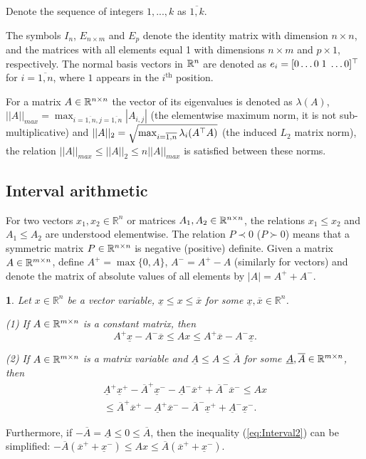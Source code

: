 \documentclass[letterpaper, 10 pt, conference]{ieeeconf}
\theoremstyle{plain}
\newtheorem{lem}{\protect\lemmaname}
\theoremstyle{definition}
\theoremstyle{plain}
\theoremstyle{plain}
\theoremstyle{remark}
\providecommand{\lemmaname}{Lemma}
\begin{document}
Denote the sequence of integers $1,...,k$ as $\overline{1,k}$. 

The symbols $I_{n}$, $E_{n\times m}$ and $E_{p}$ denote the identity matrix with dimension $n\times n$, and the matrices with all elements equal 1 with dimensions $n\times m$ and $p\times1$, respectively. The normal basis vectors in $\mathbb{R}^{n}$ are denoted as $e_{i}=[0\dots0\;1\;\dots0]^{\top}$ for $i=\overline{1,n}$, where $1$ appears in the $i^{\text{th}}$ position.

For a matrix $A\in\mathbb{R}^{n\times n}$ the vector of its eigenvalues is denoted as $\lambda(A)$, $||A||_{max}=\max_{i=\overline{1,n},j=\overline{1,n}}|A_{i,j}|$ (the elementwise maximum norm, it is not sub-multiplicative) and $||A||_{2}=\sqrt{\max_{i=\overline{1,n}}\lambda_{i}(A^{\top} A)}$ (the induced $L_{2}$ matrix norm), the relation $||A||_{max}\le||A||_{2}\le n||A||_{max}$ is satisfied between these norms.

\subsection{Interval arithmetic}

For two vectors $x_{1},x_{2}\in\mathbb{R}^{n}$ or matrices $A_{1},A_{2}\in\mathbb{R}^{n\times n}$, the relations $x_{1}\le x_{2}$ and $A_{1}\le A_{2}$ are understood elementwise. The relation $P\prec0$ ($P\succ0$) means that a symmetric matrix $P\in\mathbb{R}^{n\times n}$ is negative (positive) definite. Given a matrix $A\in\mathbb{R}^{m\times n}$, define $A^{+}=\max\{0,A\}$, $A^{-}=A^{+}-A$ (similarly for vectors) and denote the matrix of absolute values of all elements by $|A|=A^{+}+A^{-}$. 
\begin{lem}
\textup{\cite{EFRZS12}} \label{lem:interval} Let $x\in\mathbb{R}^{n}$ be a vector variable, $\underline{x}\le x\le\overline{x}$ for some $\underline{x},\overline{x}\in\mathbb{R}^{n}$. 

\textup{(1)} If $A\in\mathbb{R}^{m\times n}$ is a constant matrix, then
\begin{equation}
A^{+}\underline{x}-A^{-}\overline{x}\le Ax\le A^{+}\overline{x}-A^{-}\underline{x}.\label{eq:Interval1}
\end{equation}

\textup{(2)} If $A\in\mathbb{R}^{m\times n}$ is a matrix variable and \textup{$\underline{A}\le A\le\overline{A}$} for some $\underline{A},\overline{A}\in\mathbb{R}^{m\times n}$, then
\begin{gather}
\underline{A}^{+}\underline{x}^{+}-\overline{A}^{+}\underline{x}^{-}-\underline{A}^{-}\overline{x}^{+}+\overline{A}^{-}\overline{x}^{-}\leq Ax\label{eq:Interval2}\\
\leq\overline{A}^{+}\overline{x}^{+}-\underline{A}^{+}\overline{x}^{-}-\overline{A}^{-}\underline{x}^{+}+\underline{A}^{-}\underline{x}^{-}.\nonumber 
\end{gather}
\end{lem}
Furthermore, if $-\overline{A}=\underline{A}\le0\le\overline{A}$, then the inequality (\ref{eq:Interval2}) can be simplified: $-\overline{A}(\overline{x}^{+}+\underline{x}^{-})\leq Ax\leq\overline{A}(\overline{x}^{+}+\underline{x}^{-})$.
\end{document}
